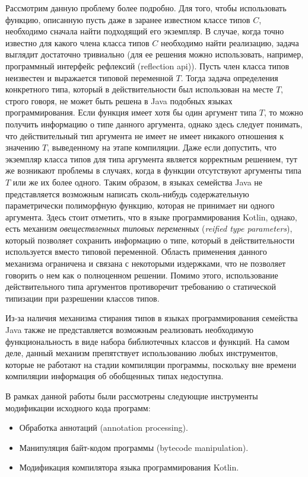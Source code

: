 Рассмотрим данную проблему более подробно. Для того, чтобы использовать функцию, описанную пусть даже в заранее известном классе типов $C$, необходимо сначала найти подходящий его экземпляр. В случае, когда точно известно для какого члена класса типов $C$ необходимо найти реализацию, задача выглядит достаточно тривиально (для ее решения можно использовать, например, программный интерфейс рефлексий (reflection api)). Пусть член класса типов неизвестен и выражается типовой переменной $T$. Тогда задача определения конкретного типа, который в действительности был использован на месте $T$, строго говоря, не может быть решена в Java подобных языках программирования. Если функция имеет хотя бы один аргумент типа $T$, то можно получить информацию о типе данного аргумента, однако здесь следует понимать, что действительный тип аргумента не имеет не имеет никакого отношения к значению $T$, выведенному на этапе компиляции. Даже если допустить, что экземпляр класса типов для типа аргумента является корректным решением, тут же возникают проблемы в случаях, когда в функции отсутствуют аргументы типа $T$ или же их более одного. Таким образом, в языках семейства Java не представляется возможным написать сколь-нибудь содержательную параметрически полиморфную функцию, которая не принимает ни одного аргумента. Здесь стоит отметить, что в языке программирования Kotlin, однако, есть механизм \emph{овеществленных типовых переменных} (\emph{reified type parameters}), который позволяет сохранить информацию о типе, который в действительности используется вместо типовой переменной. Область применения данного механизма ограничена и связана с некоторыми издержками, что не позволяет говорить о нем как о полноценном решении. Помимо этого, использование действительного типа аргументов противоречит требованию о статической типизации при разрешении классов типов.

Из-за наличия механизма стирания типов в языках программирования семейства Java также не представляется возможным реализовать необходимую функциональность в виде набора библиотечных классов и функций. На самом деле, данный механизм препятствует использованию любых инструментов, которые не работают на стадии компиляции программы, поскольку вне времени компиляции информация об обобщенных типах недоступна. 

В рамках данной работы были рассмотрены следующие инструменты модификации исходного кода программ:
\begin{itemize}
    \item Обработка аннотаций (annotation processing).
    \item Манипуляция байт-кодом программы (bytecode manipulation).
    \item Модификация компилятора языка программирования Kotlin.  
\end{itemize}

